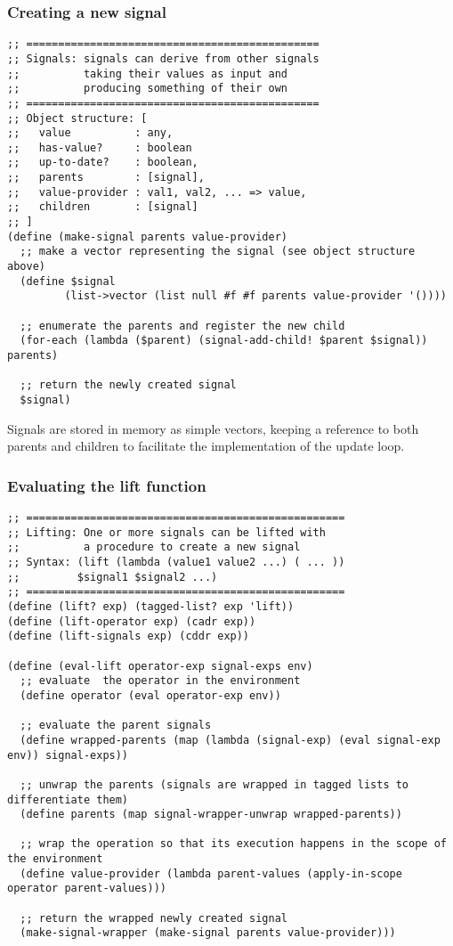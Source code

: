 \subsubsection{Creating a new signal}
\begin{lstlisting}
;; ==============================================
;; Signals: signals can derive from other signals 
;;          taking their values as input and 
;;          producing something of their own
;; ==============================================
;; Object structure: [
;;   value          : any,         
;;   has-value?     : boolean
;;   up-to-date?    : boolean,
;;   parents        : [signal],
;;   value-provider : val1, val2, ... => value,
;;   children       : [signal]
;; ]
(define (make-signal parents value-provider)
  ;; make a vector representing the signal (see object structure above)
  (define $signal 
         (list->vector (list null #f #f parents value-provider '())))

  ;; enumerate the parents and register the new child
  (for-each (lambda ($parent) (signal-add-child! $parent $signal)) parents)

  ;; return the newly created signal
  $signal)
\end{lstlisting}
Signals are stored in memory as simple vectors, keeping a reference to both parents and children to facilitate the implementation of the update loop. 

\newpage
\subsubsection{Evaluating the lift function}
\begin{lstlisting}
;; ==================================================
;; Lifting: One or more signals can be lifted with
;;          a procedure to create a new signal
;; Syntax: (lift (lambda (value1 value2 ...) ( ... )) 
;;         $signal1 $signal2 ...)
;; ==================================================
(define (lift? exp) (tagged-list? exp 'lift))
(define (lift-operator exp) (cadr exp))
(define (lift-signals exp) (cddr exp))

(define (eval-lift operator-exp signal-exps env)
  ;; evaluate  the operator in the environment
  (define operator (eval operator-exp env))
  
  ;; evaluate the parent signals
  (define wrapped-parents (map (lambda (signal-exp) (eval signal-exp env)) signal-exps))
  
  ;; unwrap the parents (signals are wrapped in tagged lists to differentiate them)
  (define parents (map signal-wrapper-unwrap wrapped-parents)) 
  
  ;; wrap the operation so that its execution happens in the scope of the environment
  (define value-provider (lambda parent-values (apply-in-scope operator parent-values)))
  
  ;; return the wrapped newly created signal
  (make-signal-wrapper (make-signal parents value-provider)))
\end{lstlisting}

